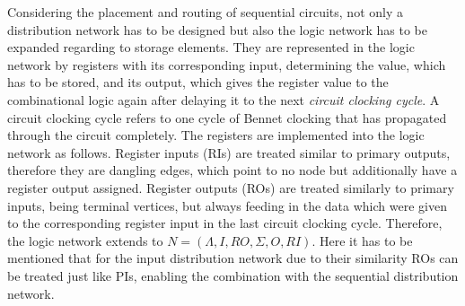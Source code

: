 Considering the placement and routing of sequential circuits, not only a distribution network has to be designed but also the logic network has to be expanded regarding to storage elements. They are represented in the logic network by registers with its corresponding input, determining the value, which has to be stored, and its output, which gives the register value to the combinational logic again after delaying it to the next \textit{circuit clocking cycle}. A circuit clocking cycle refers to one cycle of Bennet clocking that has propagated through the circuit completely. The registers are implemented into the logic network as follows. Register inputs (RIs) are treated similar to primary outputs, therefore they are dangling edges, which point to no node but additionally have a register output assigned. Register outputs (ROs) are treated similarly to primary inputs, being terminal vertices, but always feeding in the data which were given to the corresponding register input in the last circuit clocking cycle. Therefore, the logic network extends to $N = (\Lambda, I, RO, \Sigma, O, RI)$. Here it has to be mentioned that for the input distribution network due to their similarity ROs can be treated just like PIs, enabling the combination with the sequential distribution network.
